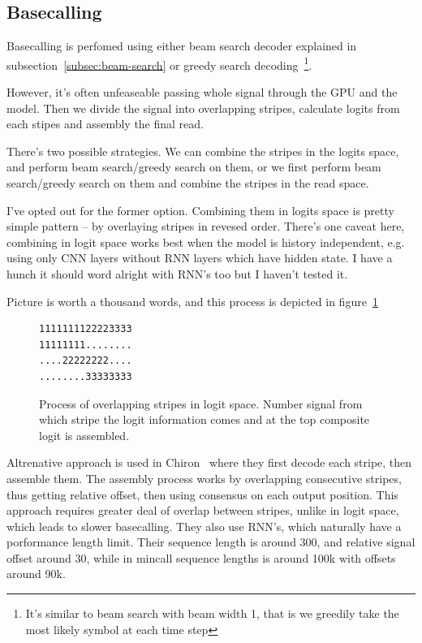 \documentclass[times, utf8, diplomski, english]{fer}
\begin{document}
\subsection{Basecalling}
\label{subsec:basecalling}

Basecalling is perfomed using either beam search decoder explained in subsection~\ref{subsec:beam-search} or greedy search 
decoding~\footnote{It's similar to beam search with beam width 1, that is we greedily take the most likely symbol at each time step}.

However, it's often unfeaseable passing whole signal through the GPU and the model. 
Then we divide the signal into overlapping stripes, calculate logits from each stipes and assembly the final read. 

There's two possible strategies. We can combine the stripes in the logits space, and perform beam search/greedy search on them, 
or we first perform beam search/greedy search on them and combine the stripes in the read space. 

I've opted out for the former option. 
Combining them in logits space is pretty simple pattern -- by overlaying stripes in revesed order.
There's one caveat here, combining in logit space works best when the model is history independent, e.g.
using only CNN layers without RNN layers which have hidden state. I have a hunch it should word alright 
with RNN's too but I haven't tested it.

Picture is worth a thousand words, and this process is depicted in figure~\ref{fg:logit_comp}

\begin{figure}
\label{fg:logit_comp}
\begin{center}
\begin{verbatim}
1111111122223333
11111111........
....22222222....
........33333333
\end{verbatim}
\caption{Process of overlapping stripes in logit space. Number signal from which stripe the logit information comes and at the top composite logit is assembled.}
\end{center}
\end{figure}

Altrenative approach is used in Chiron~\citep{chiron_teng} where they first decode each stripe, then assemble them. 
The assembly process works by overlapping consecutive stripes, thus getting relative offset, then using consensus on each output position.
This approach requires greater deal of overlap between stripes, unlike in logit space, which leads to slower basecalling.
They also use RNN's, which naturally have a porformance length limit. 
Their sequence length is around 300, and relative signal offset around 30, 
while in mincall sequence lengths is around 100k with offsets around 90k.
\end{document}
